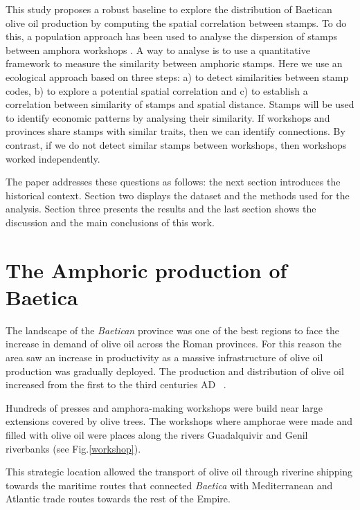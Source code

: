 \documentclass[review]{elsarticle}
\begin{document}
This study proposes a robust baseline to explore the distribution of Baetican olive oil production by computing the spatial correlation between stamps. To do this, a population approach has been used to analyse the dispersion of stamps between amphora workshops \citep{rubio-campillo_ecology_2018}.  A way to analyse is to use a quantitative framework to measure the similarity between amphoric stamps. Here we use an ecological approach based on three steps: a) to detect similarities between stamp codes, b) to explore a potential spatial correlation and c) to establish a correlation between similarity of stamps and spatial distance. Stamps will be used to identify economic patterns by analysing their similarity. If workshops and provinces share stamps with similar traits, then we can identify connections. By contrast, if we do not detect similar stamps between workshops, then workshops worked independently. 

The paper addresses these questions as follows: the next section introduces the historical context. Section two displays the dataset and the methods used for the analysis. Section three presents the results and the last section shows the discussion and the main conclusions of this work. 


\section{The Amphoric production of Baetica}

The landscape of the \textit{Baetican} province was one of the best regions to face the increase in demand of olive oil across the Roman provinces. For this reason the area saw an increase in productivity as a massive infrastructure of olive oil production was gradually deployed. The production and distribution of olive oil increased from the first to the third centuries AD ~\citep{remesal_concierto}. 


Hundreds of presses and amphora-making workshops were build near large extensions covered by olive trees. The workshops where amphorae were made and filled with olive oil were places along the rivers Guadalquivir and Genil riverbanks (see Fig.\ref{workshop}).

This strategic location allowed the transport of olive oil through riverine shipping towards the maritime routes that connected \textit{Baetica} with Mediterranean and Atlantic trade routes towards the rest of the Empire\citep{garcia_vargas_enrique_formal_2010}.
\end{document}
